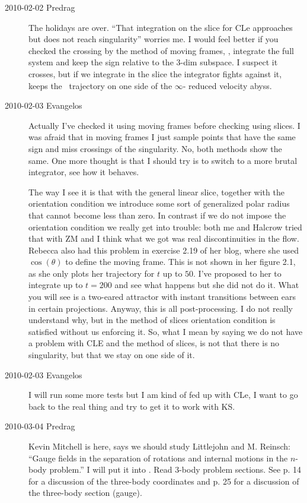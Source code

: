 \begin{description}
\item[2010-02-02 Predrag]
The holidays are over. ``That integration on the slice for
CLe approaches but does not reach singularity'' worries me. I
would feel better if you checked the crossing by the method
of moving frames, \ie, integrate the full system and keep the
sign relative to the 3-dim subspace. I suspect it crosses,
but if we integrate in the slice the integrator fights against it,
keeps the \reducedsp\ trajectory on one side of the $\infty$- reduced
velocity abyss.

\item[2010-02-03 Evangelos]
Actually I've checked it using moving frames before checking using slices.
I was afraid that in moving frames I just sample points that have the same
sign and miss crossings of the singularity. No, both methods show the same.
One more thought is that I should try is to switch to a more brutal integrator,
see how it behaves.

The way I see it is that with the general linear slice,
together with the orientation condition we introduce some
sort of generalized polar radius that cannot become less than
zero. In contrast if we do not impose the orientation
condition we really get into trouble: both me and Halcrow
tried that with ZM and I think what we got was real
discontinuities in the flow. Rebecca also had this problem in
exercise 2.19 of her blog, where she used $\cos(\theta)$ to
define the moving frame. This is not shown in her figure 2.1,
as she only plots her trajectory for $t$ up to $50$. I've
proposed to her to integrate up to $t=200$ and see what
happens but she did not do it. What you will see is a
two-eared attractor with instant transitions between ears in
certain projections. Anyway, this is all post-processing. I
do not really understand why, but in the method of slices
orientation condition is satisfied without us enforcing it.
So, what I mean by saying we do not have a problem with CLE
and the method of slices, is not that there is no
singularity, but that we stay on one side of it.

\item[2010-02-03 Evangelos] I will run some more tests but I am kind
of fed up with CLe, I want to go back to the real thing and try
to get it to work with KS.

\item[2010-03-04 Predrag]
Kevin Mitchell is here, says we should study Littlejohn and
M. Reinsch: ``Gauge fields in the separation of
rotations and internal motions in the $n$-body problem.'' I
will put it into . Read 3-body problem
sections. See p. 14 for a discussion of the three-body
coordinates and p. 25 for a discussion of the three-body
section (gauge).


\end{description}
